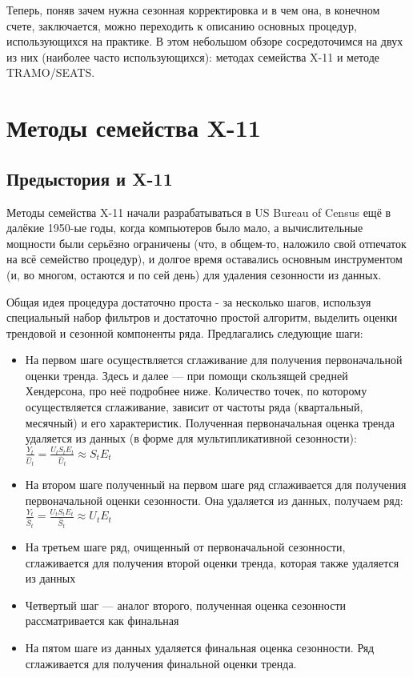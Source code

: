 \documentclass[final,pdftex]{../../template/epsilonj}\usepackage[]{graphicx}\usepackage[]{color}
\begin{document}
Теперь, поняв зачем нужна сезонная корректировка и в чем она, в конечном счете, заключается, можно переходить к описанию основных процедур, использующихся на практике. 
В этом небольшом обзоре сосредоточимся на двух из них (наиболее часто использующихся): методах семейства X-11 и методе TRAMO/SEATS. 

\section{Методы семейства X-11} 
\subsection{Предыстория и X-11}

Методы семейства X-11 начали разрабатываться в US Bureau of Census ещё в далёкие 1950-ые годы, когда компьютеров было мало, а вычислительные мощности были серьёзно ограничены (что, в общем-то, наложило свой отпечаток на всё семейство процедур), и долгое время оставались основным инструментом (и, во многом, остаются и по сей день) для удаления сезонности из данных. 

Общая идея процедура достаточно проста - за несколько шагов, используя специальный набор фильтров и достаточно простой алгоритм, выделить оценки трендовой и сезонной компоненты ряда. Предлагались следующие шаги:

\begin{itemize}
\item На первом шаге осуществляется сглаживание для получения первоначальной оценки тренда. Здесь и далее --- при помощи скользящей средней Хендерсона, про неё подробнее ниже.  Количество точек, по которому осуществляется сглаживание, зависит от частоты ряда (квартальный, месячный) и его характеристик. Полученная первоначальная оценка тренда удаляется из данных (в форме для мультипликативной сезонности): $\frac{Y_t}{\hat{U}_t} = \frac{U_t S_t E_t}{\hat{U}_t} \approx S_t E_t$
\item На втором шаге полученный на первом шаге ряд сглаживается для получения первоначальной оценки сезонности. Она удаляется из данных, получаем ряд:  $\frac{Y_t}{\hat{S}_t} = \frac{U_t S_t E_t}{\hat{S}_t} \approx U_t E_t$
\item На третьем шаге ряд, очищенный от первоначальной сезонности, сглаживается для получения второй оценки тренда, которая также удаляется из данных
\item Четвертый шаг --- аналог второго, полученная оценка сезонности рассматривается как финальная
\item На пятом шаге из данных удаляется финальная оценка сезонности. Ряд сглаживается для получения финальной оценки тренда. 
\end{itemize}
\end{document}

